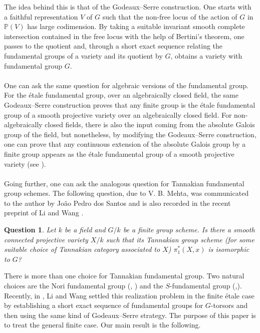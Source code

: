 \documentclass[a4paper,12pt]{amsart}
\newtheorem*{question}{Question}
\numberwithin{equation}{section}
\renewcommand{\_}{\rule{0.25cm}{0.4pt}}
\begin{document}
The idea behind this is that of the Godeaux--Serre construction. One starts with a faithful representation $V$ of $G$ such that the non-free locus of the action of $G$ in $\mathbb{P}(V)$ has large codimension. By taking a suitable invariant smooth complete intersection contained in the free locus with the help of Bertini's theorem, one passes to the quotient and, through a short exact sequence relating the fundamental groups of a variety and its quotient by $G$, obtains a variety with fundamental group $G$.
\\
\\
One can ask the same question for algebraic versions of the fundamental group. For the étale fundamental group, over an algebraically closed field, the same Godeaux--Serre construction proves that any finite group is the étale fundamental group of a smooth projective variety over an algebraically closed field. For non-algebraically closed fields, there is also the input coming from the absolute Galois group of the field, but nonetheless, by modifying the Godeaux--Serre construction, one can prove that any continuous extension of the absolute Galois group by a finite group appears as the étale fundamental group of a smooth projective variety (see \cite{Rungtanapirom2018}).
\\
\\
Going further, one can ask the analogous question for Tannakian fundamental group schemes. The following question, due to V. B. Mehta, was communicated to the author by João Pedro dos Santos and is also recorded in the recent preprint of Li and Wang \cite{li2026varietiesprescribedfundamentalgroup}.

\begin{question}
Let $k$ be a field and $G/k$ be a finite group scheme. Is there a smooth connected projective variety $X/k$ such that its Tannakian group scheme (for some suitable choice of Tannakian category associated to $X$) $\pi_{1}^{\ast}(X,x)$ is isomorphic to $G$?
\end{question}

There is more than one choice for Tannakian fundamental group. Two natural choices are the Nori fundamental group (\cite{Nori}, \cite{Nori1982-tm}) and the $S$-fundamental group (\cite{AIF_2011__61_5_2077_0},\cite{Langer2012-ap}). Recently, in \cite{li2026varietiesprescribedfundamentalgroup}, Li and Wang settled this realization problem in the finite étale case by establishing a short exact sequence of fundamental groups for $G$-torsors and then using the same kind of Godeaux--Serre strategy. The purpose of this paper is to treat the general finite case. Our main result is the following.
\end{document}
